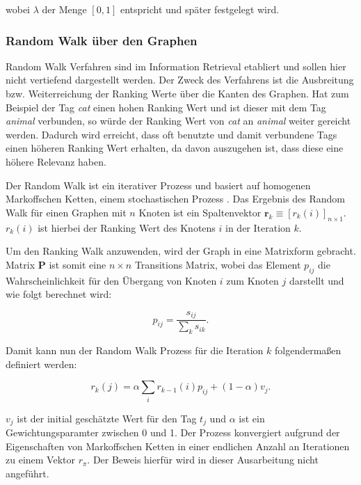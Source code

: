 wobei $\lambda$ der Menge $[0,1]$ entspricht und später festgelegt wird.




\subsubsection{Random Walk über den Graphen} %
\label{ssub:random_walk_ueber_den_graphen}
Random Walk Verfahren sind im Information Retrieval etabliert und sollen hier nicht vertiefend dargestellt werden. Der Zweck des Verfahrens ist die Ausbreitung bzw. Weiterreichung der Ranking Werte über die Kanten des Graphen. Hat zum Beispiel der Tag \emph{cat} einen hohen Ranking Wert und ist dieser mit dem Tag \emph{animal} verbunden, so würde der Ranking Wert von \emph{cat} an \emph{animal} weiter gereicht werden. Dadurch wird erreicht, dass oft benutzte und damit verbundene Tags einen höheren Ranking Wert erhalten, da davon auszugehen ist, dass diese eine höhere Relevanz haben.

Der Random Walk ist ein iterativer Prozess und basiert auf homogenen Markoffschen Ketten, einem stochastischen Prozess \cite{bronstein}. Das Ergebnis des Random Walk für einen Graphen mit $n$ Knoten ist ein Spaltenvektor $\textbf{r}_k \equiv [r_k(i)]_{n \times 1}$. $r_k(i)$ ist hierbei der Ranking Wert des Knotens $i$ in der Iteration $k$. 

Um den Ranking Walk anzuwenden, wird der Graph in eine Matrixform gebracht. Matrix \textbf{P} ist somit eine $n \times n$ Transitions Matrix, wobei das Element $p_{ij}$ die Wahrscheinlichkeit für den Übergang von Knoten $i$ zum Knoten $j$ darstellt und wie folgt berechnet wird:
\begin{figure}[hptb]
  \begin{equation}
  \label{fig:probabilityScore}
    p_{ij} = \frac{s_{ij}}{\sum_k s_{ik}}.
  \end{equation}
\end{figure}

Damit kann nun der Random Walk Prozess für die Iteration $k$ folgendermaßen definiert werden:
\begin{figure}[hptb]
  \begin{equation}
  \label{fig:randomWalk}
    r_k(j) = \alpha \sum_i r_{k-1}(i)p_{ij} + (1 - \alpha)v_j.
  \end{equation}
\end{figure}

$v_j$ ist der initial geschätzte Wert für den Tag $t_j$ und $\alpha$ ist ein Gewichtungsparamter zwischen 0 und 1. Der Prozess konvergiert aufgrund der Eigenschaften von Markoffschen Ketten in einer endlichen Anzahl an Iterationen zu einem Vektor $r_\pi$. Der Beweis hierfür wird in dieser Ausarbeitung nicht angeführt.


